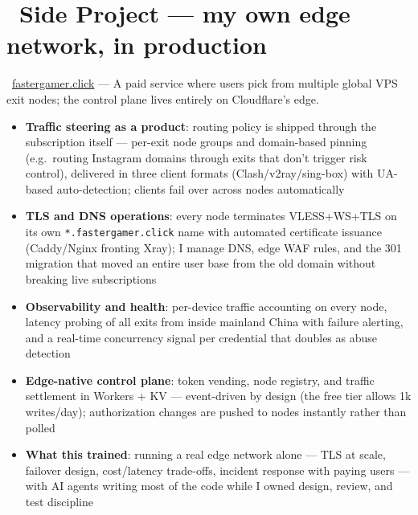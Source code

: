 \documentclass{resume}
\begin{document}
\section{\faLightbulbO\ Side Project --- my own edge network, in production}
\begin{onehalfspacing}
\faGlobe\ \href{https://fastergamer.click}{fastergamer.click} ---
A paid service where users pick from multiple global VPS exit nodes; the control plane lives entirely on Cloudflare's edge.
\begin{itemize}
	\item \textbf{Traffic steering as a product}: routing policy is shipped through the subscription itself --- per-exit node groups and domain-based pinning (e.g.\ routing Instagram domains through exits that don't trigger risk control), delivered in three client formats (Clash/v2ray/sing-box) with UA-based auto-detection; clients fail over across nodes automatically
	\item \textbf{TLS and DNS operations}: every node terminates VLESS+WS+TLS on its own \texttt{*.fastergamer.click} name with automated certificate issuance (Caddy/Nginx fronting Xray); I manage DNS, edge WAF rules, and the 301 migration that moved an entire user base from the old domain without breaking live subscriptions
	\item \textbf{Observability and health}: per-device traffic accounting on every node, latency probing of all exits from inside mainland China with failure alerting, and a real-time concurrency signal per credential that doubles as abuse detection
	\item \textbf{Edge-native control plane}: token vending, node registry, and traffic settlement in Workers + KV --- event-driven by design (the free tier allows 1k writes/day); authorization changes are pushed to nodes instantly rather than polled
	\item \textbf{What this trained}: running a real edge network alone --- TLS at scale, failover design, cost/latency trade-offs, incident response with paying users --- with AI agents writing most of the code while I owned design, review, and test discipline
\end{itemize}
\end{onehalfspacing}
\end{document}
